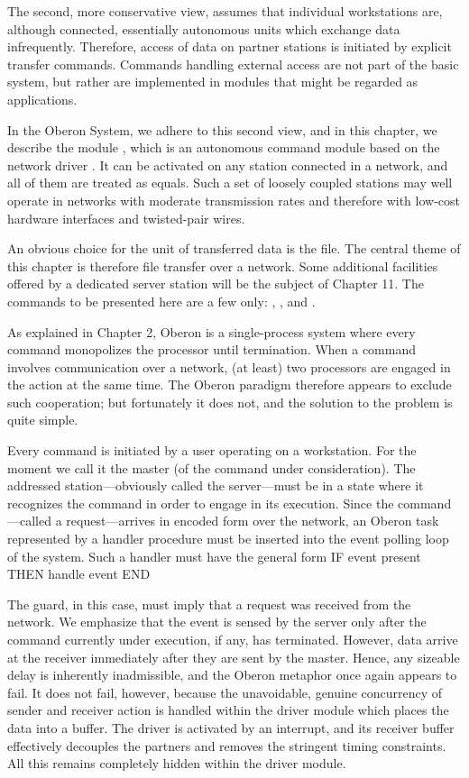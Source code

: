 The second, more conservative view, assumes that individual workstations are, although connected, essentially autonomous units which exchange data infrequently. Therefore, access of data on partner stations is initiated by explicit transfer commands. Commands handling external access are not part of the basic system, but rather are implemented in modules that might be regarded as applications.

In the Oberon System, we adhere to this second view, and in this chapter, we describe the module , which is an autonomous command module based on the network driver . It can be activated on any station connected in a network, and all of them are treated as equals. Such a set of loosely coupled stations may well operate in networks with moderate transmission rates and therefore with low-cost hardware interfaces and twisted-pair wires.

An obvious choice for the unit of transferred data is the file. The central theme of this chapter is therefore file transfer over a network. Some additional facilities offered by a dedicated server station will be the subject of Chapter 11. The commands to be presented here are a few only: , , and .

As explained in Chapter 2, Oberon is a single-process system where every command monopolizes the processor until termination. When a command involves communication over a network, (at least) two processors are engaged in the action at the same time. The Oberon paradigm therefore appears to exclude such cooperation; but fortunately it does not, and the solution to the problem is quite simple.

Every command is initiated by a user operating on a workstation. For the moment we call it the master (of the command under consideration). The addressed station---obviously called the server---must be in a state where it recognizes the command in order to engage in its execution. Since the command---called a request---arrives in encoded form over the network, an Oberon task represented by a handler procedure must be inserted into the event polling loop of the system. Such a handler must have the general form
\begintt
IF event present THEN handle event END
\endtt

\noindent The guard, in this case, must imply that a request was received from the network. We emphasize that the event is sensed by the server only after the command currently under execution, if any, has terminated. However, data arrive at the receiver immediately after they are sent by the master. Hence, any sizeable delay is inherently inadmissible, and the Oberon metaphor once again appears to fail. It does not fail, however, because the unavoidable, genuine concurrency of sender and receiver action is handled within the driver module which places the data into a buffer. The driver is activated by an interrupt, and its receiver buffer effectively decouples the partners and removes the stringent timing constraints. All this remains completely hidden within the driver module.

